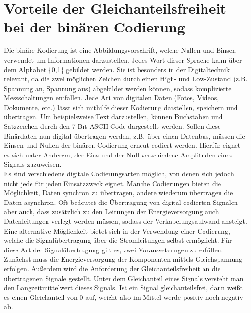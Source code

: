 \section{Vorteile der Gleichanteilsfreiheit bei der binären Codierung}
Die binäre Kodierung ist eine Abbildungsvorschrift, welche Nullen und Einsen verwendet
um Informationen darzustellen. Jedes Wort dieser Sprache kann über dem Alphabet \{0,1\} gebildet werden.
Sie ist besonders in der Digitaltechnik relevant, da die zwei möglichen Zeichen durch
einen High- und Low-Zustand (z.B. Spannung an, Spannung aus) abgebildet werden können, sodass komplizierte Messschaltungen entfallen.\autocite[379]{Fricke2003}
Jede Art von digitalen Daten (Fotos, Videos, Dokumente, etc.) lässt sich mithilfe dieser Kodierung
darstellen, speichern und übertragen. Um beispielsweise Text darzustellen, können Buchstaben und Satzzeichen
durch den 7-Bit ASCII Code dargestellt werden.
Sollen diese Binärdaten nun digital übertragen werden, z.B. über einen Datenbus, müssen die Einsen und Nullen
der binären Codierung erneut codiert werden. Hierfür eignet es sich unter Anderem, der Eins und der Null
verschiedene Amplituden eines Signals zuzuweisen.\\
Es sind verschiedene digitale Codierungsarten möglich, von denen sich jedoch nicht jede für jeden Einsatzzweck eignet.
Manche Codierungen bieten die Möglichkeit, Daten synchron zu übertragen, andere wiederum übertragen die Daten asynchron.
Oft bedeutet die Übertragung von digital codierten Signalen aber auch, dass zusätzlich zu den Leitungen der Energieversorgung auch 
Datenleitungen verlegt werden müssen, sodass der Verkabelungsaufwand ansteigt. Eine alternative Möglichkeit bietet sich 
in der Verwendung einer Codierung, welche die Signalübertragung über die Stromleitungen selbst ermöglicht.
Für diese Art der Signalübertragung gilt es, zwei Voraussetzungen zu erfüllen. Zunächst muss die Energieversorgung der
Komponenten mittels Gleichspannung erfolgen. Außerdem wird die Anforderung der Gleichanteilsfreiheit an die übertragenen
Signale gestellt. 
Unter dem Gleichanteil eines Signals versteht man den Langzeitmittelwert dieses Signals. Ist ein Signal gleichanteilsfrei, dann
weißt es einen Gleichanteil von 0 auf, weicht also im Mittel werde positiv noch negativ ab. \autocite[55]{Schnell2019} \\

